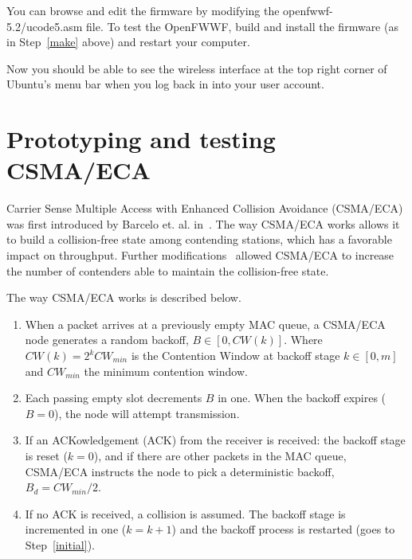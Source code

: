 \documentclass[conference]{IEEEtran}
\begin{document}
You can browse and edit the firmware by modifying the openfwwf-5.2/ucode5.asm file. To test the OpenFWWF, build and install the firmware (as in Step~\ref{make} above) and restart your computer.

Now you should be able to see the wireless interface at the top right corner of Ubuntu's menu bar when you log back in into your user account.

\section{Prototyping and testing CSMA/ECA}\label{explanation}
Carrier Sense Multiple Access with Enhanced Collision Avoidance (CSMA/ECA) was first introduced by Barcelo et. al. in~\cite{barcelo2008lba}. The way CSMA/ECA works allows it to build a collision-free state among contending stations, which has a favorable impact on throughput. Further modifications~\cite{research2standards} allowed CSMA/ECA to increase the number of contenders able to maintain the collision-free state.

The way CSMA/ECA works is described below.

\begin{enumerate}
	\item When a packet arrives at a previously empty MAC queue, a CSMA/ECA node generates a random backoff, $B\in[0,CW(k)]$. Where $CW(k)=2^{k}CW_{min}$ is the Contention Window at backoff stage $k\in[0,m]$ and $CW_{min}$ the minimum contention window.\label{initial}
 	\item Each passing empty slot decrements $B$ in one. When the backoff expires ($B=0$), the node will attempt transmission.
 	\item If an ACKowledgement (ACK) from the receiver is received: the backoff stage is reset ($k=0$), and if there are other packets in the MAC queue, CSMA/ECA instructs the node to pick a deterministic backoff, $B_{d}=CW_{min}/2$.\label{reset}
 	\item If no ACK is received, a collision is assumed. The backoff stage is incremented in one ($k=k+1$) and the backoff process is restarted (goes to Step~\ref{initial}).
\end{enumerate}

\end{document}
